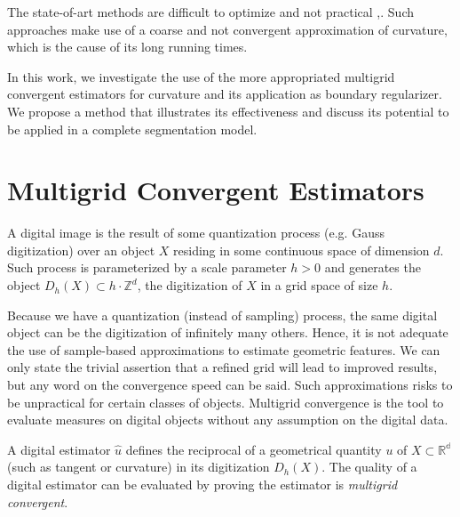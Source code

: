\documentclass[runningheads]{llncs}
\begin{document}
The state-of-art methods are difficult to optimize and  not practical \cite{schoenemann09},\cite{nieuwenhuis14}. Such approaches make use of a coarse and not convergent approximation of curvature, which is the cause of its long running times. 

In this work, we investigate the use of the more appropriated multigrid convergent estimators for curvature and its application as boundary regularizer. We propose a method that illustrates its effectiveness and discuss its potential to be applied in a complete segmentation model. 


\section{Multigrid Convergent Estimators}



A digital image is the result of some quantization process (e.g. Gauss digitization) over an object $X$ residing in some continuous space of dimension $d$. Such process is parameterized by a scale parameter $h>0$ and generates the object $D_h(X) \subset h \cdot \mathbb{Z}^d$, the digitization of $X$ in a grid space of size $h$. 


Because we have a quantization (instead of sampling) process, the same digital object can be the digitization of infinitely many others. Hence, it is not adequate the use of sample-based approximations to estimate geometric features. We can only state the trivial assertion that a refined grid will lead to improved results, but any word on the convergence speed can be said. Such approximations risks to be unpractical for certain classes of objects. Multigrid convergence is the tool to evaluate measures on digital objects without any assumption on the digital data. 

A digital estimator $\hat{u}$ defines  the reciprocal of a geometrical quantity $u$ of $X \subset \mathbb{R^d}$ (such as tangent or curvature) in its digitization $D_h(X)$. The quality of a digital estimator can be evaluated by proving the estimator is \textit{multigrid convergent}. 
	
\end{document}
